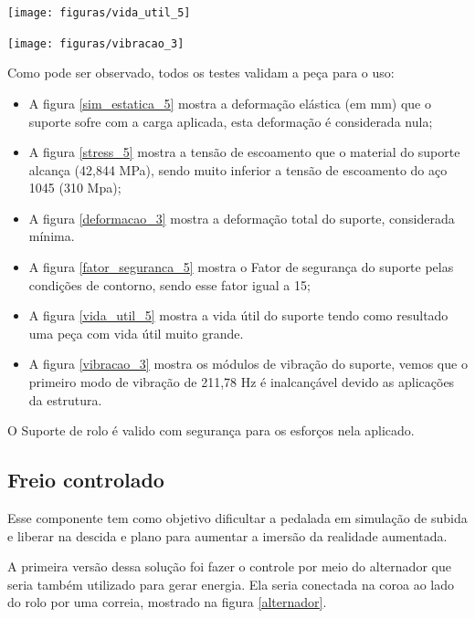     \begin{center}
    	\texttt{[image: figuras/vida\_util\_5]}
        \label{vida_util_5}
    \end{center} 
    
    \begin{center}
    	\texttt{[image: figuras/vibracao\_3]}
        \label{vibracao_3}
    \end{center} 
 
Como pode ser observado, todos os testes validam a peça para o uso:
\begin{itemize}
    \item A figura \ref{sim_estatica_5} mostra a deformação elástica (em mm) que o suporte sofre com a carga aplicada, esta deformação é considerada nula;
    \item A figura \ref{stress_5} mostra a tensão de escoamento que o material do suporte alcança (42,844 MPa), sendo muito inferior a tensão de escoamento do aço 1045 (310 Mpa);
    \item A figura \ref{deformacao_3} mostra a deformação total do suporte, considerada mínima.
    \item A figura \ref{fator_seguranca_5} mostra o Fator de segurança do suporte pelas condições de contorno, sendo esse fator igual a 15;
    \item A figura \ref{vida_util_5} mostra a vida útil do suporte tendo como resultado uma peça com vida útil muito grande.
    \item A figura \ref{vibracao_3} mostra os módulos de vibração do suporte, vemos que o primeiro modo de vibração de 211,78 Hz é inalcançável devido as aplicações da estrutura.
\end{itemize}

O Suporte de rolo é valido com segurança para os esforços nela aplicado.

\subsection{Freio controlado} \label{freio.controlado}
    Esse componente tem como objetivo dificultar a pedalada em simulação de subida e liberar na descida e plano para aumentar a imersão da realidade aumentada.

    A primeira versão dessa solução foi fazer o controle por meio do alternador que seria também utilizado para gerar energia. Ela seria conectada na coroa ao lado do rolo por uma correia, mostrado na figura \ref{alternador}.

